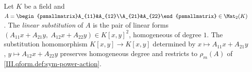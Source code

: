 Let $K$ be a field and $A=\begin{psmallmatrix}A_{11}&A_{12}\\A_{21}&A_{22}\end{psmallmatrix}\in\Mat_2(K)$. The \emph{linear substitution} of $A$ is the pair of linear forms
$(A_{11}x+A_{21}y,\;A_{12}x+A_{22}y)\in K[x,y]^2$, homogeneous of degree $1$. The substitution homomorphism $K[x,y]\to K[x,y]$ determined by $x\mapsto A_{11}x+A_{21}y$, $y\mapsto A_{12}x+A_{22}y$
preserves homogeneous degree and restricts to $\rho_m(A)$ of \cref{III.qform.def:sym-power-action}.
